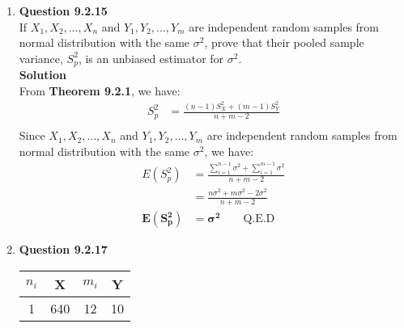 \documentclass{uofa-eng-assignment}
\begin{document}
\begin{enumerate}
    \item[]
        \textbf{Question 9.2.15} \\
        If $X_1, X_2, \ldots , X_n$ and $Y_1, Y_2, \ldots , Y_m$ are independent random samples
        from normal distribution with the same $\sigma^2$,
        prove that their pooled sample variance, $S_p^2$, is an unbiased estimator for $\sigma^2$. \\
        \textbf{Solution} \\
        From \textbf{Theorem 9.2.1}, we have:
        \begin{align*}
            S_p^2 & = \frac{(n-1)S_X^2 + (m-1)S_Y^2}{n+m-2} \\
        \end{align*}
        Since $X_1, X_2, \ldots , X_n$ and $Y_1, Y_2, \ldots , Y_m$ are independent random samples
        from normal distribution with the same $\sigma^2$, we have:
        \begin{align*}
            E(S_p^2)              & = \frac{\sum_{i=1}^{n-1}\sigma^2 + \sum_{i=1}^{m-1}\sigma^2}{n+m-2} \\
                                  & = \frac{n\sigma^2 + m\sigma^2 - 2\sigma^2}{n+m-2}                   \\
            \boldsymbol{E(S_p^2)} & = \boldsymbol{\sigma^2} \qquad \text{Q.E.D}
        \end{align*}
    \item[]
        \textbf{Question 9.2.17} \\
        \begin{tabular}{c c c c}
            \hline
            $n_i$ & X    & $m_i$ & Y   \\
            \hline
            1     & 640  & 12    & 10  \\


\end{tabular}
\end{enumerate}
\end{document}

